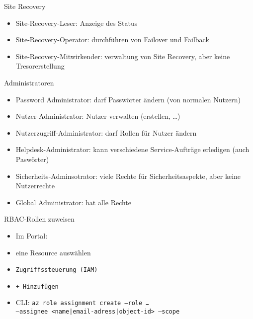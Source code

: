 \begin{flashcard}[Definition]{Site Recovery}
    \begin{itemize}
        \item Site-Recovery-Leser: Anzeige des Status
        \item Site-Recovery-Operator: durchführen von Failover und Failback
        \item Site-Recovery-Mitwirkender: verwaltung von Site Recovery, aber keine Tresorerstellung
    \end{itemize}
\end{flashcard}


\begin{flashcard}[Definition]{Administratoren}
    \begin{itemize}
        \item Password Administrator: darf Passwörter ändern (von normalen Nutzern)
        \item Nutzer-Administrator: Nutzer verwalten (erstellen, \ldots)
        \item Nutzerzugriff-Administrator: darf Rollen für Nutzer ändern
        \item Helpdesk-Administrator: kann verschiedene Service-Aufträge erledigen (auch Paswörter)
        \item Sicherheits-Adminsotrator: viele Rechte für Sicherheitsaspekte, aber keine Nutzerrechte
        \item Global Administrator: hat alle Rechte
    \end{itemize}
\end{flashcard}





\begin{flashcard}[Definition]{RBAC-Rollen zuweisen}
    \begin{itemize}
        \item Im Portal:\newline
            \item eine Resource auswählen
            \item \texttt{Zugriffssteuerung (IAM)}
            \item \texttt{+ Hinzufügen}
        \item CLI:\newline
            \texttt{az role assignment create --role \ldots\\--assignee <name|email-adress|object-id> --scope}
    \end{itemize}
\end{flashcard}

